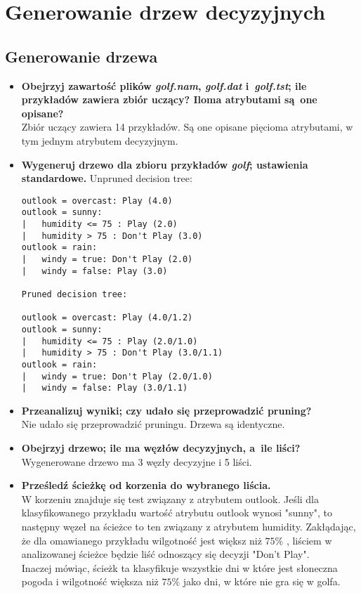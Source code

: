 
\section{Generowanie drzew decyzyjnych}

\subsection{Generowanie drzewa}

\begin{itemize}
\item \textbf{Obejrzyj zawartość plików \emph{golf.nam}, \emph{golf.dat} i~\emph{golf.tst}; ile przykładów zawiera zbiór uczący? Iloma atrybutami są~one opisane?}
	\\Zbiór uczący zawiera 14 przykładów. Są one opisane pięcioma atrybutami, w tym jednym atrybutem decyzyjnym.

\item \textbf{Wygeneruj drzewo dla zbioru przykładów \emph{golf}; ustawienia standardowe.}
	 Unpruned decision tree:

\begin{verbatim}
outlook = overcast: Play (4.0)
outlook = sunny:
|   humidity <= 75 : Play (2.0)
|   humidity > 75 : Don't Play (3.0)
outlook = rain:
|   windy = true: Don't Play (2.0)
|   windy = false: Play (3.0)

Pruned decision tree:

outlook = overcast: Play (4.0/1.2)
outlook = sunny:
|   humidity <= 75 : Play (2.0/1.0)
|   humidity > 75 : Don't Play (3.0/1.1)
outlook = rain:
|   windy = true: Don't Play (2.0/1.0)
|   windy = false: Play (3.0/1.1)
\end{verbatim}



\item \textbf{Przeanalizuj wyniki; czy udało się przeprowadzić pruning?}
	\\Nie udało się przeprowadzić pruningu. Drzewa są identyczne.

\item \textbf{Obejrzyj drzewo; ile ma węzłów decyzyjnych, a~ile liści?}
	\\Wygenerowane drzewo ma 3 węzły decyzyjne i 5 liści.

\item \textbf{ Prześledź ścieżkę od korzenia do wybranego liścia.
}		\\W korzeniu znajduje się test związany z atrybutem outlook. Jeśli dla klasyfikowanego przykładu wartość atrybutu outlook wynosi "sunny", to następny węzeł na ścieżce to ten związany z atrybutem humidity. Zakłądając, że dla omawianego przykładu wilgotność jest większ niż $ 75\% $ , liściem w analizowanej ścieżce będzie liść odnoszący się decyzji "Don't Play".
		\\Inaczej mówiąc, ścieżk ta klasyfikuje wszystkie dni w które jest słoneczna pogoda i wilgotność większa niż $ 75\% $ jako dni, w które nie gra się w golfa.
		

\end{itemize}
